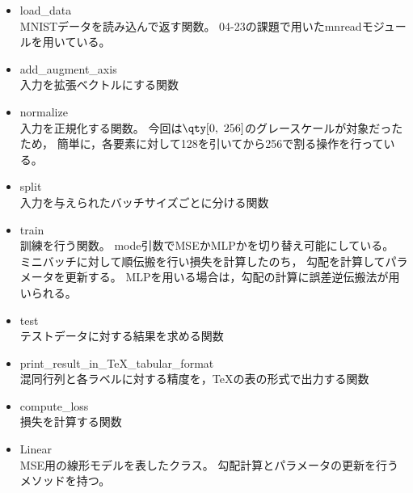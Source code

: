 \documentclass[class=jsarticle, crop=false, dvipdfmx, fleqn]{standalone}
\begin{document}
\begin{itemize}
    \item load\_data \\
        MNISTデータを読み込んで返す関数。
        04-23の課題で用いたmnreadモジュールを用いている。
    \item add\_augment\_axis \\
        入力を拡張ベクトルにする関数
    \item normalize \\
        入力を正規化する関数。
        今回は\(\qty[0,\ 256]\)のグレースケールが対象だったため，
        簡単に，各要素に対して128を引いてから256で割る操作を行っている。
    \item split \\
        入力を与えられたバッチサイズごとに分ける関数
    \item train \\
        訓練を行う関数。
        mode引数でMSEかMLPかを切り替え可能にしている。
        ミニバッチに対して順伝搬を行い損失を計算したのち，
        勾配を計算してパラメータを更新する。
        MLPを用いる場合は，勾配の計算に誤差逆伝搬法が用いられる。
    \item test \\
        テストデータに対する結果を求める関数
    \item print\_result\_in\_TeX\_tabular\_format \\
        混同行列と各ラベルに対する精度を，{\TeX}の表の形式で出力する関数
    \item compute\_loss \\
        損失を計算する関数
    \item Linear \\
        MSE用の線形モデルを表したクラス。
        勾配計算とパラメータの更新を行うメソッドを持つ。
\end{itemize}
\end{document}
